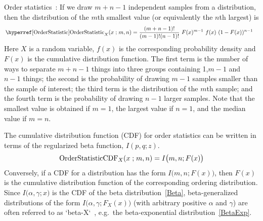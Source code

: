 

\clearpage
{}


\label{OrderStatistic}
Order statistics~\cite{David2005}: If we draw $m+n-1$ independent samples from a distribution, then the distribution of the $m$th smallest value (or equivalently the $n$th largest) is
\begin{align*}
&\opr{OrderStatistic}_{X}(x \given m, n)  
= \frac{(m+n-1)!}{(m-1)!(n-1)!} \ F(x)^{m-1}\ f(x)\ (1- F(x))^{n-1}
\end{align*}
Here $X$ is a random variable, $f(x)$ is the corresponding probability density and $F(x)$ is the cumulative distribution function. The first term is the number of ways to separate $m+n-1$ things into three groups containing 1,$m-1$ and $n-1$ things; the second is the probability of drawing $m-1$ samples smaller than the sample of interest; the third term is the distribution of the $m$th sample; and the fourth term is the probability of drawing $n-1$ larger samples. Note that the smallest value is obtained if $m=1$, the largest value if $n=1$, and the median value if $m=n$.

The cumulative distribution function (CDF) for order statistics can be written in terms of the regularized beta function, $I(p,q;z)$.
\begin{align*}
\operatorname{OrderStatisticCDF}_{X}(x \mathrel{;} m, n)  = I\bigl(m,n; F(x) \bigr)
\end{align*}
Conversely, if a CDF for a distribution has the form $I\bigl(m,n; F(x) \bigr)$, then $F(x)$ is the cumulative distribution function of the corresponding ordering distribution. Since $I\bigl(\alpha,\gamma;x \bigr)$ is the CDF of the beta distribution~\eqref{Beta}, beta-generalized distributions of the form $I\bigl(\alpha,\gamma; F_X(x) \bigr)$ (with arbitrary positive $\alpha$ and $\gamma$) are often referred to as `beta-X`~\cite{Eugene2002}, e.g.\ the beta-exponential distribution~\eqref{BetaExp}.


